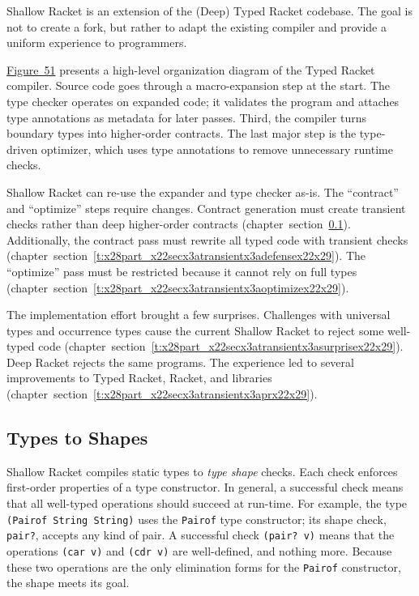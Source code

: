 \documentclass[ twoside,open=right,titlepage,numbers=noenddot,headinclude,%
                footinclude=true,cleardoublepage=empty,abstract=off,
                BCOR=5mm,paper=a4,fontsize=11pt,%
                ngerman,american,%
                parts,pdfspacing]{scrreprt}
\newcommand{\SecRef}[2]{section~#1}
\newcommand{\SecRefLocal}[3]{\hyperref[#1]{\SecRef{#2}{#3}}}
\newcommand{\Scribtexttt}[1]{{\texttt{#1}}}
\newcommand{\Ssubsubsection}[2]{\subsubsection[#1]{#2}}
\newcommand{\FigureRef}[2]{#1}
\renewcommand{\Ssubsubsection}[2]{\subsection[#1]{#2}}
\renewcommand{\SecRefLocal}[3]{section~\ref{#1}}
\begin{document}
Shallow Racket is an extension of the (Deep) Typed Racket codebase.
The goal is not to create a fork, but rather to adapt the existing compiler
 and provide a uniform experience to programmers.

\hyperref[t:x28counter_x28x22figurex22_x22figx3atransientx3atrx2doverviewx22x29x29]{Figure~\FigureRef{51}{t:x28counter_x28x22figurex22_x22figx3atransientx3atrx2doverviewx22x29x29}} presents a high{-}level organization diagram of the
 Typed Racket compiler.
Source code goes through a macro{-}expansion step at the start.
The type checker operates on expanded code; it validates the program and
 attaches type annotations as metadata for later passes.
Third, the compiler turns boundary types into higher{-}order contracts.
The last major step is the type{-}driven optimizer, which uses type annotations
 to remove unnecessary runtime checks.

Shallow Racket can re{-}use the expander and type checker as{-}is.
The {``}contract{''} and {``}optimize{''} steps require changes.
Contract generation must create transient checks rather than
 deep higher{-}order contracts (chapter~\SecRefLocal{t:x28part_x22secx3atransientx3atypesx22x29}{5.3.1}{Types to Shapes}).
Additionally, the contract pass must rewrite all typed code with transient
 checks (chapter~\SecRefLocal{t:x28part_x22secx3atransientx3adefensex22x29}{5.3.2}{Inserting Shape Checks}).
The {``}optimize{''} pass must be restricted because it cannot rely on full types (chapter~\SecRefLocal{t:x28part_x22secx3atransientx3aoptimizex22x29}{5.3.3}{Optimizer}).

The implementation effort brought a few surprises.
Challenges with universal types and occurrence types cause the current
 Shallow Racket to reject some well{-}typed code (chapter~\SecRefLocal{t:x28part_x22secx3atransientx3asurprisex22x29}{5.3.2.1}{Current Limitations}).
Deep Racket rejects the same programs.
The experience led to several improvements to Typed Racket, Racket, and
 libraries (chapter~\SecRefLocal{t:x28part_x22secx3atransientx3aprx22x29}{5.3.4}{Bonus Fixes and Enhancements}).

\Ssubsubsection{Types to Shapes}{Types to Shapes}\label{t:x28part_x22secx3atransientx3atypesx22x29}

Shallow Racket compiles static types to \emph{type shape} checks.
Each check enforces first{-}order properties of a type constructor.
In general, a successful check means that all well{-}typed operations
 should succeed at run{-}time.
For example, the type \Scribtexttt{(Pairof String String)} uses the \Scribtexttt{Pairof}
 type constructor; its shape check, \Scribtexttt{pair{\hbox{\texttt{?}}}}, accepts any kind of
 pair.
A successful check \Scribtexttt{(pair{\hbox{\texttt{?}}} v)} means that the operations
 \Scribtexttt{(car v)} and \Scribtexttt{(cdr v)} are well{-}defined, and nothing more.
Because these two operations are the only elimination forms for the
 \Scribtexttt{Pairof} constructor, the shape meets its goal.
\end{document}

